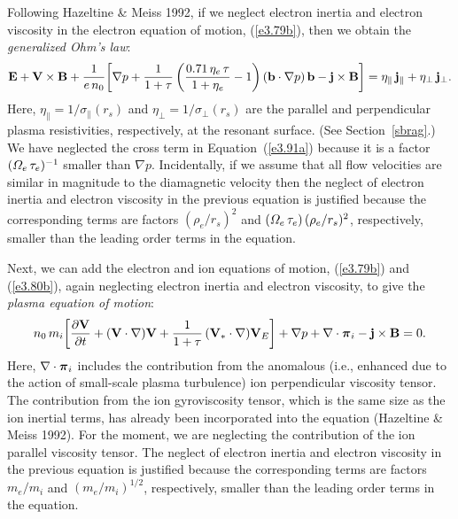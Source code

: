 \documentclass[notitlepage,12pt]{article}
\newcommand{\bpi}{\mbox{\boldmath$\pi$}}
\begin{document}
Following Hazeltine \& Meiss 1992, if we neglect electron inertia and electron viscosity  in the electron equation of motion, (\ref{e3.79b}), then
we obtain the {\em generalized Ohm's law}: 
\begin{equation}\label{e220}
{\bf E} + {\bf V}\times {\bf B} + \frac{1}{e\,n_0}\!\left[\nabla p + \frac{1}{1+\tau}\left(\frac{0.71\,\eta_e\,\tau}{1+\eta_e}-1\right)({\bf b}\cdot\nabla p)\,{\bf b} -{\bf j}\times{\bf B}\right] = \eta_\parallel\,{\bf j}_\parallel + \eta_\perp\,{\bf j}_\perp.
\end{equation}
Here, $\eta_\parallel=1/\sigma_\parallel(r_s)$ and $\eta_\perp=1/\sigma_\perp(r_s)$ are the parallel and perpendicular plasma
resistivities,  respectively, at the resonant surface. (See Section~\ref{sbrag}.) We have neglected the cross term in Equation~(\ref{e3.91a})
because it is a factor $({\mit\Omega}_e\,\tau_e)^{-1}$  smaller than $\nabla p$. Incidentally, if we assume that all
flow velocities are similar in magnitude to the diamagnetic velocity then the neglect of
electron inertia and electron viscosity in the previous equation is justified because the corresponding terms are factors
$(\rho_e/r_s)^2$ and $({\mit\Omega}_e\,\tau_e)\,(\rho_e/r_s)^2$, respectively, smaller than the leading order terms
in the equation. 

Next, we can add the electron and ion equations of motion, (\ref{e3.79b}) and (\ref{e3.80b}), again neglecting electron inertia and electron viscosity, 
to give the {\em plasma equation of motion}: 
\begin{equation}
n_0\,m_i\!\left[\frac{\partial {\bf V}}{\partial t} + ({\bf V}\cdot\nabla ){\bf V} + \frac{1}{1+\tau}\,({\bf V}_\ast\cdot\nabla){\bf V}_E\right]
+ \nabla p + \nabla\cdot\bpi_i - {\bf j}\times {\bf B}= 0.
\end{equation}
Here, $\nabla\cdot\bpi_i$ includes the contribution from the anomalous (i.e., enhanced due to the action of small-scale plasma turbulence) ion perpendicular viscosity tensor. The contribution from the ion gyroviscosity tensor,
which is the same size as the ion inertial terms, has already been incorporated into the equation (Hazeltine \& Meiss 1992). For the moment, we are neglecting the contribution of the ion parallel viscosity tensor. The neglect of electron inertia and electron viscosity in the previous equation is justified because
the corresponding terms are factors $m_e/m_i$ and $(m_e/m_i)^{1/2}$, respectively, smaller than the leading order
terms in the equation. 
\end{document}
